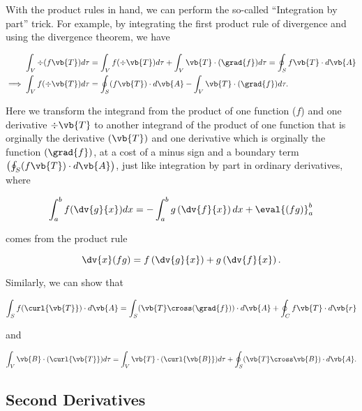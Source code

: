 \documentclass[english,a4paper,12pt]{report}
\begin{document}
With the product rules in hand, we can perform the so-called ``Integration by part'' trick. For example, by integrating the first product rule of divergence and using the divergence theorem, we have
	
\begin{equation} 
	\begin{aligned}
	\int_{V} \div{(f\vb{T})} d\tau &= \int_{V} f(\div{\vb{T}}) d\tau + \int_{V} \vb{T} \cdot (\grad{f}) d\tau = \oint_{S} f\vb{T} \cdot d\vb{A} \\
	\implies \int_{V} f(\div{\vb{T}}) d\tau &= \oint_{S} (f\vb{T}) \cdot d\vb{A} - \int_{V} \vb{T} \cdot (\grad{f}) d\tau. 
	\end{aligned}
\end{equation}
	
Here we transform the integrand from the product of one function (\(f\)) and one derivative \(\div{\vb{T}}\) to another integrand of the product of one function that is orginally the derivative \((\vb{T})\) and one derivative which is orginally the function \((\grad{f})\), at a cost of a minus sign and a boundary term \(\left(\oint_{S} (f\vb{T}) \cdot d\vb{A}\right)\), just like integration by part in ordinary derivatives, where
	
\begin{equation} 
	\int_{a}^{b} f(\dv{g}{x})dx = -\int_{a}^{b} g\left(\dv{f}{x}\right)dx + \eval{\left(fg\right)}_a^b 
\end{equation}
	
comes from the product rule
	
\begin{equation} 
	\dv{x}(fg) = f\left(\dv{g}{x}\right) + g\left(\dv{f}{x}\right). 
\end{equation}

Similarly, we can show that 
	
\begin{equation} 
	\int_{S} f(\curl{\vb{T}}) \cdot d\vb{A} = \int_{S} (\vb{T} \cross (\grad{f})) \cdot d\vb{A} + \oint_{C} f\vb{T} \cdot d\vb{r} 
\end{equation}
	
and

\begin{equation} 
	\int_{V} \vb{B} \cdot (\curl{\vb{T}}) d\tau = \int_{V} \vb{T} \cdot (\curl{\vb{B}}) d\tau + \oint_{S} (\vb{T} \cross \vb{B}) \cdot d\vb{A}. 
\end{equation}
	
\subsection{Second Derivatives}
	
\end{document}

